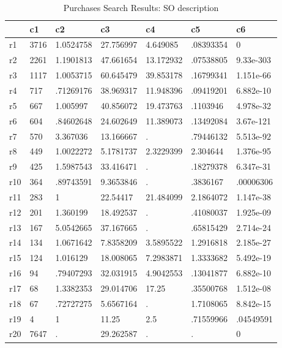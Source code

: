 \begin{table}[htbp]
\caption{\label{taba2} Purchases Search Results: SO description}\centering\medskip
\begin{tabular}{|l|l|l|l|l|l|l|}\hline  
 & c1  & c2  & c3  & c4  & c5  & c6  \\ \hline  
r1 & 3716 & 1.0524758 & 27.756997 & 4.649085 & .08393354 & 0 \\ \hline 
r2 & 2261 & 1.1901813 & 47.661654 & 13.172932 & .07538805 & 9.33e-303 \\ \hline 
r3 & 1117 & 1.0053715 & 60.645479 & 39.853178 & .16799341 & 1.151e-66 \\ \hline 
r4 & 717 & .71269176 & 38.969317 & 11.948396 & .09419201 & 6.882e-10 \\ \hline 
r5 & 667 & 1.005997 & 40.856072 & 19.473763 & .1103946 & 4.978e-32 \\ \hline 
r6 & 604 & .84602648 & 24.602649 & 11.389073 & .13492084 & 3.67e-121 \\ \hline 
r7 & 570 & 3.367036 & 13.166667 & . & .79446132 & 5.513e-92 \\ \hline 
r8 & 449 & 1.0022272 & 5.1781737 & 2.3229399 & 2.304644 & 1.376e-95 \\ \hline 
r9 & 425 & 1.5987543 & 33.416471 & . & .18279378 & 6.347e-31 \\ \hline 
r10 & 364 & .89743591 & 9.3653846 & . & .3836167 & .00006306 \\ \hline 
r11 & 283 & 1 & 22.54417 & 21.484099 & 2.1864072 & 1.147e-38 \\ \hline 
r12 & 201 & 1.360199 & 18.492537 & . & .41080037 & 1.925e-09 \\ \hline 
r13 & 167 & 5.0542665 & 37.167665 & . & .65815429 & 2.714e-24 \\ \hline 
r14 & 134 & 1.0671642 & 7.8358209 & 3.5895522 & 1.2916818 & 2.185e-27 \\ \hline 
r15 & 124 & 1.016129 & 18.008065 & 7.2983871 & 1.3333682 & 5.492e-19 \\ \hline 
r16 & 94 & .79407293 & 32.031915 & 4.9042553 & .13041877 & 6.882e-10 \\ \hline 
r17 & 68 & 1.3382353 & 29.014706 & 17.25 & .35500768 & 1.512e-08 \\ \hline 
r18 & 67 & .72727275 & 5.6567164 & . & 1.7108065 & 8.842e-15 \\ \hline 
r19 & 4 & 1 & 11.25 & 2.5 & .71559966 & .04549591 \\ \hline 
r20 & 7647 & . & 29.262587 & . & . & 0 \\ \hline 
  \end{tabular}
\end{table}
